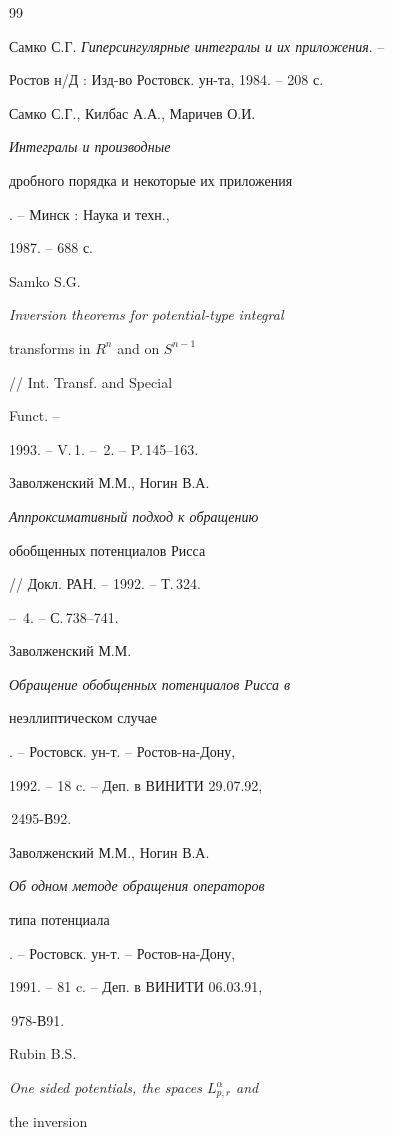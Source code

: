 \begin{thebibliography}{99} 


 




Самко С.Г. {\em Гиперсингулярные интегралы и их приложения}. -- 


Ростов н/Д : Изд-во Ростовск. ун-та, 1984. -- 208 с. 




Самко С.Г., Килбас А.А., Маричев О.И. {\em Интегралы и производные  


дробного порядка и некоторые их приложения}. -- Минск : Наука и техн., 


1987. -- 688 с. 




Samko S.G. {\em Inversion theorems for potential-type integral  


transforms in $R^n$ and on $S^{n-1}$} // Int. Transf. and Special 


Funct. -- 


1993. -- V.\,1. -- \No\,2. -- P.\,145--163. 




Заволженский М.М., Ногин В.А. {\em Аппроксимативный подход к обращению  


обобщенных потенциалов Рисса} // Докл. РАН. -- 1992. -- Т.\,324. 


-- \No\,4. -- С.\,738--741. 




Заволженский М.М. {\em Обращение обобщенных потенциалов Рисса в  


неэллиптическом случае}. -- Ростовск. ун-т. -- Ростов-на-Дону,


1992. -- 18 c. -- Деп. в ВИНИТИ 29.07.92, 


\No\,2495-В92. 




Заволженский М.М., Ногин В.А. {\em Об одном методе обращения операторов  


типа потенциала}. -- Ростовск. ун-т. -- Ростов-на-Дону,


1991. -- 81 c. -- Деп. в ВИНИТИ 06.03.91, 


\No\,978-В91. 




Rubin B.S. {\em One sided potentials, the spaces $L^\alpha_{p,r}$ and 


the inversion  


}
\end{thebibliography}
